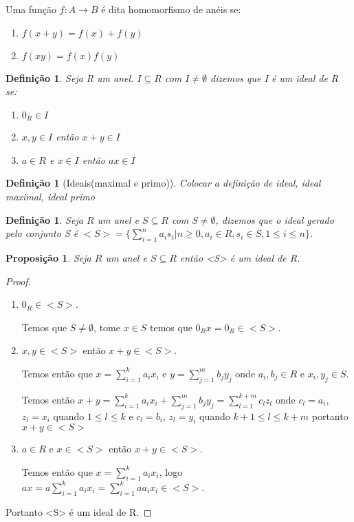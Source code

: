 \documentclass[10pt,a4paper]{article}
\newtheorem{proposition}[theorem]{Proposição}
\newtheorem{definition}[theorem]{Definição}
\begin{document}
 Uma função $f:A \rightarrow B $ é dita homomorfismo de anéis se:
\begin{enumerate}
	\item $f(x+y)=f(x)+f(y)$
	\item $f(xy)=f(x)f(y)$
\end{enumerate}

\begin{definition}Seja R um anel. $I \subseteq R$ com $I \neq \emptyset$ dizemos que I é um ideal de R se:
	\begin{enumerate}
		\item $0_R \in I$
		\item $x,y \in I$ então $x+y \in I$
		\item $a \in R$ e $x \in I$ então $ax \in I$
	\end{enumerate}
\end{definition} 
 
\begin{definition}
	[Ideais(maximal e primo)] Colocar a definição de ideal, ideal maximal, ideal primo
\end{definition}

\begin{definition}
	Seja $R$ um anel e $S \subseteq R$ com $S \neq \emptyset$, dizemos que o ideal gerado pelo conjunto S é $<S>=\{ \sum_{i=1}^{n} a_i s_i | n \geq 0, a_i \in R, s_i \in S, 1 \leq i \leq n\}$.
\end{definition}

\begin{proposition}
	Seja $R$ um anel e $S \subseteq R$ então <S> é um ideal de R.
\end{proposition}
\begin{proof}
	\begin{enumerate}
		\item $0_R \in <S>$.
		
		Temos que $S \neq \emptyset$, tome $x \in S$ temos que $0_R x = 0_R \in <S>$.
		
		\item $x, y \in <S>$ então $x+y \in <S>$.
		
		Temos então que $x=\sum_{i=1}^{k}a_i x_i$ e $y=\sum_{j=1}^{m}b_j y_j$ onde $a_i, b_j \in R$ e $x_i, y_j \in S$.
		
		Temos então $x+y=\sum_{i=1}^{k}a_i x_i + \sum_{j=1}^{m}b_j y_j = \sum_{l=1}^{k+m} c_l z_l$ onde $c_l = a_i$, $z_l = x_i$  quando $1 \leq l \leq k$ e $c_l = b_i$, $z_l = y_i$  quando $k+1 \leq l \leq k+m$ portanto $x+y \in <S>$
		
		\item $a \in R$ e $x\in <S>$ então $x+y \in <S>$.
		
		Temos então que $x=\sum_{i=1}^{k}a_i x_i$, logo $ax=a\sum_{i=1}^{k}a_i x_i = \sum_{i=1}^{k}aa_i x_i \in <S>$.
	\end{enumerate}

	Portanto <S> é um ideal de R.
\end{proof}
\end{document}
